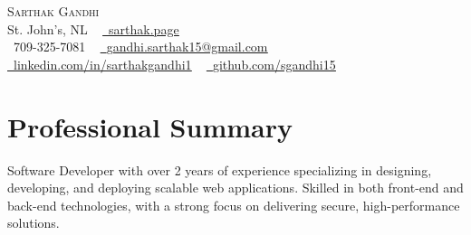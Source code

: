 \documentclass[letterpaper,11pt]{article}
\begin{document}
\begin{center}
    {\Huge \scshape Sarthak Gandhi} \\ \vspace{1pt}
    St. John's, NL ~ \vspace{1pt} \href{https://sarthak.page/}{\raisebox{-0.2\height}\faCode\ {\underline{sarthak.page}}} \\
    \small \raisebox{-0.1\height}\faPhone\ 709-325-7081 ~ 
    \href{mailto:gandhi.sarthak15@gmail.com}
    {\raisebox{-0.2\height}\faEnvelope\ {\underline{gandhi.sarthak15@gmail.com}}} ~ 
    \href{https://www.linkedin.com/in/sarthakgandhi1/}
    {\raisebox{-0.2\height}\faLinkedin\ {\underline{linkedin.com/in/sarthakgandhi1}}}  ~
    \href{https://github.com/sgandhi15}
    {\raisebox{-0.2\height}\faGithub\ {\underline{github.com/sgandhi15}}}
    \vspace{-8pt}
\end{center}



\section{Professional Summary}
Software Developer with over 2 years of experience specializing in designing, developing, and deploying scalable web applications. Skilled in both front-end and back-end technologies, with a strong focus on delivering secure, high-performance solutions.\vspace{-8pt}
\end{document}
